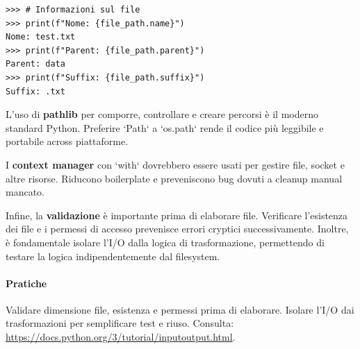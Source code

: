 \begin{tcolorbox}[title=Per chi viene da C/Java/JS: filesystem e flussi]
\begin{tcolorbox}[title={\faTerminal\ Output}, colback=black!5, colframe=black!70]
\begin{lstlisting}[style=python]
>>> # Informazioni sul file
>>> print(f"Nome: {file_path.name}")
Nome: test.txt
>>> print(f"Parent: {file_path.parent}")
Parent: data
>>> print(f"Suffix: {file_path.suffix}")
Suffix: .txt
\end{lstlisting}
\end{tcolorbox}
\end{tcolorbox}

\begin{tcolorbox}[title={Idiomi: pathlib, context manager, validazione}]
L'uso di \textbf{pathlib} per comporre, controllare e creare percorsi è il moderno standard Python. Preferire `Path` a `os.path` rende il codice più leggibile e portabile across piattaforme.

I \textbf{context manager} con `with` dovrebbero essere usati per gestire file, socket e altre risorse. Riducono boilerplate e preveniscono bug dovuti a cleanup manual mancato.

Infine, la \textbf{validazione} è importante prima di elaborare file. Verificare l'esistenza dei file e i permessi di accesso prevenisce errori cryptici successivamente. Inoltre, è fondamentale isolare l'I/O dalla logica di trasformazione, permettendo di testare la logica indipendentemente dal filesystem.
\end{tcolorbox}

\paragraph{Pratiche} Validare dimensione file, esistenza e permessi prima di elaborare. Isolare l'I/O dai trasformazioni per semplificare test e riuso.
Consulta: \url{https://docs.python.org/3/tutorial/inputoutput.html}.
